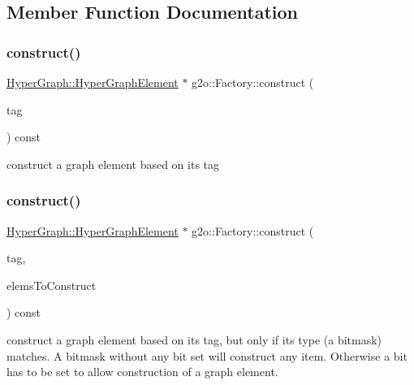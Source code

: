 \subsection{Member Function Documentation}
\mbox{\label{classg2o_1_1_factory_aa61fcb8861afb1dd4c4af5d9cc03d3ec}} 
\subsubsection{\texorpdfstring{construct()}{construct()}\hspace{0.1cm}{\footnotesize\ttfamily [1/2]}}
{\footnotesize\ttfamily \mbox{\hyperlink{structg2o_1_1_hyper_graph_1_1_hyper_graph_element}{Hyper\+Graph\+::\+Hyper\+Graph\+Element}} $\ast$ g2o\+::\+Factory\+::construct (\begin{DoxyParamCaption}\item[{const std\+::string \&}]{tag }\end{DoxyParamCaption}) const}

construct a graph element based on its tag \mbox{\label{classg2o_1_1_factory_a8c3800dfa57718d2ceb4f6150611540d}} 
\subsubsection{\texorpdfstring{construct()}{construct()}\hspace{0.1cm}{\footnotesize\ttfamily [2/2]}}
{\footnotesize\ttfamily \mbox{\hyperlink{structg2o_1_1_hyper_graph_1_1_hyper_graph_element}{Hyper\+Graph\+::\+Hyper\+Graph\+Element}} $\ast$ g2o\+::\+Factory\+::construct (\begin{DoxyParamCaption}\item[{const std\+::string \&}]{tag,  }\item[{const \mbox{\hyperlink{classg2o_1_1_hyper_graph_a7b8fda20e1b03e92aeceeac6e8218b73}{Hyper\+Graph\+::\+Graph\+Elem\+Bitset}} \&}]{elems\+To\+Construct }\end{DoxyParamCaption}) const}

construct a graph element based on its tag, but only if it\textquotesingle{}s type (a bitmask) matches. A bitmask without any bit set will construct any item. Otherwise a bit has to be set to allow construction of a graph element. \mbox{\label{classg2o_1_1_factory_ab40f0aa18dabb91a35de7186ede9355a}} 
